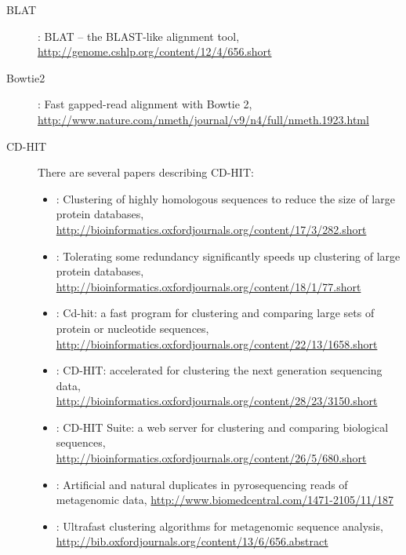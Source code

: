 \documentclass[a4paper, 11pt, twoside]{article}
\begin{document}
\begin{description}
 \item[BLAT] \citet{Kent2002}: BLAT -- the BLAST-like alignment tool, \href{http://genome.cshlp.org/content/12/4/656.short}{http://genome.cshlp.org/content/12/4/656.short}
 \item[Bowtie2] \citet{Langmead2012}: Fast gapped-read alignment with Bowtie 2, \href{http://www.nature.com/nmeth/journal/v9/n4/full/nmeth.1923.html}{http://www.nature.com/nmeth/journal/v9/n4/full/nmeth.1923.html}
 \item[CD-HIT] There are several papers describing CD-HIT:
  \begin{itemize}
    \item \citet{Li2001}: Clustering of highly homologous sequences to reduce the size of large protein databases, \href{http://bioinformatics.oxfordjournals.org/content/17/3/282.short}{http://bioinformatics.oxfordjournals.org/content/17/3/282.short}
    \item \citet{Li2002}: Tolerating some redundancy significantly speeds up clustering of large protein databases, \href{http://bioinformatics.oxfordjournals.org/content/18/1/77.short}{http://bioinformatics.oxfordjournals.org/content/18/1/77.short}
    \item \citet{Li2006}: Cd-hit: a fast program for clustering and comparing large sets of protein or nucleotide sequences, \href{http://bioinformatics.oxfordjournals.org/content/22/13/1658.short}{http://bioinformatics.oxfordjournals.org/content/22/13/1658.short}
    \item \citet{Fu2012}: CD-HIT: accelerated for clustering the next generation sequencing data, \href{http://bioinformatics.oxfordjournals.org/content/28/23/3150.short}{http://bioinformatics.oxfordjournals.org/content/28/23/3150.short}
    \item \citet{Huang2010}: CD-HIT Suite: a web server for clustering and comparing biological sequences, \href{http://bioinformatics.oxfordjournals.org/content/26/5/680.short}{http://bioinformatics.oxfordjournals.org/content/26/5/680.short}
    \item \citet{Niu2010}: Artificial and natural duplicates in pyrosequencing reads of metagenomic data, \href{http://www.biomedcentral.com/1471-2105/11/187}{http://www.biomedcentral.com/1471-2105/11/187}
    \item \citet{Li2012b}: Ultrafast clustering algorithms for metagenomic sequence analysis, \href{http://bib.oxfordjournals.org/content/13/6/656.abstract}{http://bib.oxfordjournals.org/content/13/6/656.abstract}

\end{itemize}
\end{description}
\end{document}
